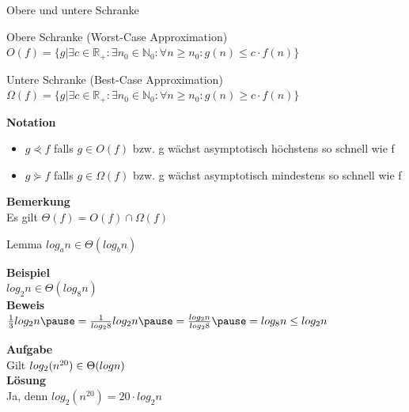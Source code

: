 \documentclass[]{beamer}
\begin{document}
\begin{frame}{Obere und untere Schranke}
	\begin{block}{Obere Schranke (Worst-Case Approximation)}
		$O(f) = \{g| \exists c \in \mathbb{R}_+ : \exists n_0 \in \mathbb{N}_0: \forall n \geq n_0 : g(n)\leq c \cdot f(n)\}$
	\end{block}

	\pause
	
	\begin{block}{Untere Schranke (Best-Case Approximation)}
		$\Omega(f) = \{g| \exists c \in \mathbb{R}_+ : \exists n_0 \in \mathbb{N}_0: \forall n \geq n_0 : g(n)\geq c \cdot f(n)\}$
	\end{block}
	\pause
	\textbf{Notation}\\
	\begin{itemize}
		\item $g\curlyeqprec f$ falls $g \in O(f)$ bzw. g wächst asymptotisch höchstens so schnell wie f
		\item $g \curlyeqsucc f $ falls $g \in \Omega (f)$ bzw. g wächst asymptotisch mindestens so schnell wie f
	\end{itemize}
	\pause
	\textbf{Bemerkung}\\
	Es gilt $\Theta (f) = O(f) \cap \Omega (f)$
\end{frame}

\begin{frame}
	\begin{block}{Lemma}
		$log_a n \in \Theta (log_b n)$
	\end{block}
	\textbf{Beispiel}\\
	$log_2 n \in \Theta(log_8 n)$\\
	\pause
	\textbf{Beweis}\\
	$\frac{1}{3} log_2 n \ip= \frac{1}{log_2 8} log_2 n \ip= \frac{log_2 n}{log_2 8} \ip= log_8 n \leq log_2 n$
\end{frame}

\begin{frame}
	\textbf{Aufgabe}\\
	Gilt $log_2(n^{20}) \in \Theta (log \space n)$\\
	\pause
	\textbf{Lösung}\\
	Ja, denn $log_2 (n^{20}) = 20 \cdot log_2 n$
\end{frame}
\end{document}
